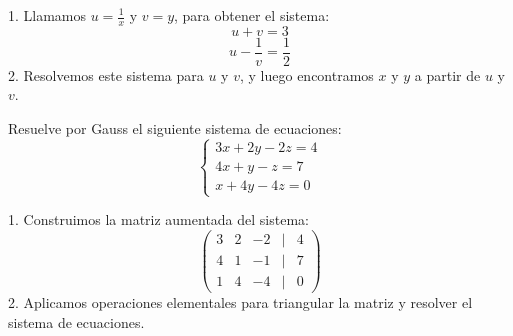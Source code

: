 \documentclass[addpoints,spanish, 12pt,a4paper]{exam}
\begin{document}
\begin{questions}
\begin{solution}
1. Llamamos \(u = \frac{1}{x}\) y \(v = y\), para obtener el sistema:
   \[
   u + v = 3
   \]
   \[
   u - \frac{1}{v} = \frac{1}{2}
   \]
2. Resolvemos este sistema para \(u\) y \(v\), y luego encontramos \(x\) y \(y\) a partir de \(u\) y \(v\).
\end{solution}

\question Resuelve por Gauss el siguiente sistema de ecuaciones:
\[
\begin{cases}
3x + 2y - 2z = 4 \\
4x + y - z = 7 \\
x + 4y - 4z = 0
\end{cases}
\]

\begin{solution}
1. Construimos la matriz aumentada del sistema:
   \[
   \begin{pmatrix}
   3 & 2 & -2 & | & 4 \\
   4 & 1 & -1 & | & 7 \\
   1 & 4 & -4 & | & 0
   \end{pmatrix}
   \]
2. Aplicamos operaciones elementales para triangular la matriz y resolver el sistema de ecuaciones.
\end{solution}


\end{questions}
\end{document}
